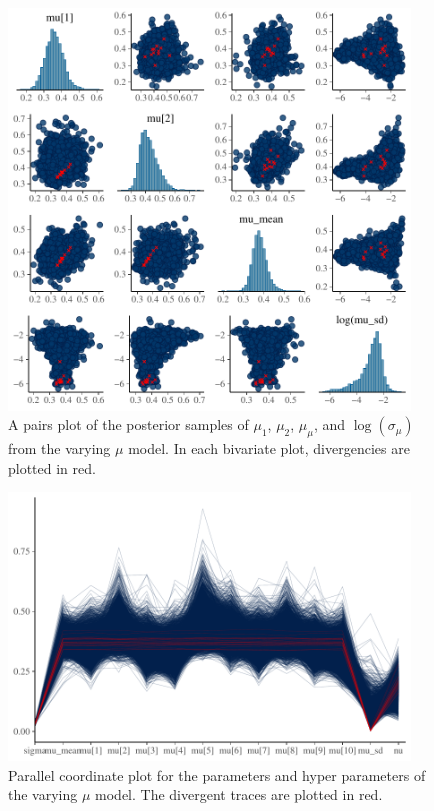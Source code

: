 \begin{figure}
   \centering
   \includegraphics[width=0.95\textwidth]{./figures/ch-5/plot-pp-mu-pairs.pdf}
   \caption{A pairs plot of the posterior samples of $\mu_1$, $\mu_2$, $\mu_\mu$, and $\log(\sigma_\mu)$ from the varying $\mu$ model. In each bivariate plot, divergencies are plotted in red.}
   \label{fig:pp_mu_pairs} 
\end{figure}

\begin{figure}
   \centering
   \includegraphics[width=0.95\textwidth]{./figures/ch-5/plot-pp-mu-parcoord.pdf}
   \caption{Parallel coordinate plot for the parameters and hyper parameters of the varying $\mu$ model. The divergent traces are plotted in red.}
   \label{fig:pp_mu_parcoord} 
\end{figure}

